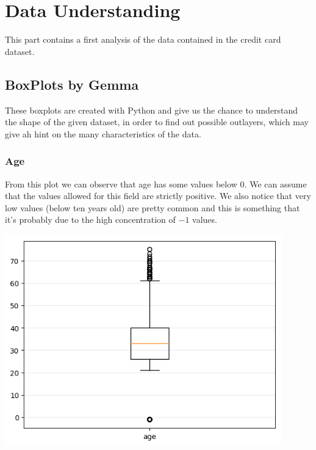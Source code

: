 \documentclass[a4paper]{article}
\begin{document}

\tableofcontents
\newpage




\section{Data Understanding}

This part contains a first analysis of the data contained in the credit card dataset.

\subsection{BoxPlots by Gemma}
These boxplots are created with Python and give us the chance to understand the shape of the given dataset, in order to find out possible outlayers, which may give ah hint on the many characteristics of the data.
\subsubsection{Age}
From this plot we can observe that age has some values below $0$. We can assume that the values allowed for this field are strictly positive. We also notice that very low values (below ten years old) are pretty common and this is something that it's probably due to the high concentration of $-1$ values.
\begin{center}
\includegraphics[width=0.9\textwidth]{../Code/boxPlotsGemma/boxplots/age.png}
\end{center}
\end{document}
